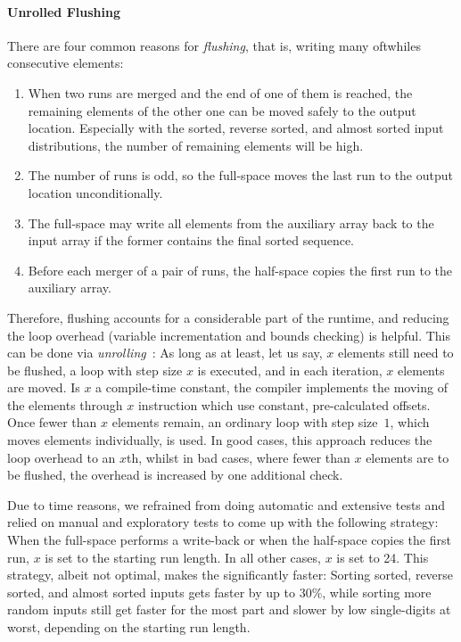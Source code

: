 \paragraph{Unrolled Flushing}
There are four common reasons for \emph{flushing}, that is, writing \Dash many oftwhiles \Dash consecutive elements:
\begin{enumerate}
	\item
	When two runs are merged and the end of one of them is reached, the remaining elements of the other one can be moved safely to the output location.
	Especially with the sorted, reverse sorted, and almost sorted input distributions, the number of remaining elements will be high.

	\item
	The number of runs is odd, so the full-space \MS{} moves the last run to the output location unconditionally.

	\item
	The full-space \MS{} may write all elements from the auxiliary array back to the input array if the former contains the final sorted sequence.

	\item
	Before each merger of a pair of runs, the half-space \MS{} copies the first run to the auxiliary array.
\end{enumerate}
Therefore, flushing accounts for a considerable part of the runtime, and reducing the loop overhead (variable incrementation and bounds checking) is helpful.
This can be done via \emph{unrolling}~\cite{penschuck2024personal}:
As long as at least, let us say, \(x\) elements still need to be flushed, a loop with step size \(x\) is executed, and in each iteration, \(x\) elements are moved.
Is \(x\) a compile-time constant, the compiler implements the moving of the elements through \(x\) instruction which use constant, pre-calculated offsets.
Once fewer than \(x\) elements remain, an ordinary loop with step size~\(1\), which moves elements individually, is used.
In good cases, this approach reduces the loop overhead to an \(x\)th, whilst in bad cases, where fewer than \(x\) elements are to be flushed, the overhead is increased by one additional check.

Due to time reasons, we refrained from doing automatic and extensive tests and relied on manual and exploratory tests to come up with the following strategy:
When the full-space \MS{} performs a write-back or when the half-space \MS{} copies the first run, \(x\) is set to the starting run length.
In all other cases, \(x\) is set to 24.
This strategy, albeit not optimal, makes the \MS*{} significantly faster:
Sorting sorted, reverse sorted, and almost sorted inputs gets faster by up to 30\%, while sorting more random inputs still get faster for the most part and slower by low single-digits at worst, depending on the starting run length.



